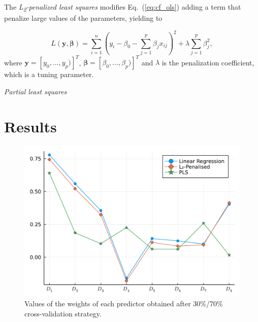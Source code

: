 \documentclass[conference]{IEEEtran}
\begin{document}
The \emph{L\textsubscript{2}-penalized least squares} modifies Eq.~(\ref{eq:cf_ols}) adding a term that penalize large values of the parameters, yielding to

\begin{equation}
  L(\mathbf{y}, \boldsymbol{\beta}) = \sum_{i=1}^{n}\left(y_{i}-\beta_{0}-\sum_{j=1}^{p} \beta_{j} x_{i j}\right)^{2}+\lambda \sum_{j=1}^{p} \beta_{j}^{2},
\end{equation}
%
where $\mathbf{y} = [y_0, ..., y_p)]^T$, $\boldsymbol{\beta} = [\beta_0, ..., \beta_p)]^T$ and $\lambda$ is the penalization coefficient, which is a tuning parameter.

\emph{Partial least squares}

\section{Results}

\begin{figure}[htbp]
\centerline{\includegraphics[width=\columnwidth]{../figures/fitted_params_70}}
\caption{Values of the weights of each predictor obtained after 30\%/70\% cross-validation strategy.}
\end{figure}
\end{document}
